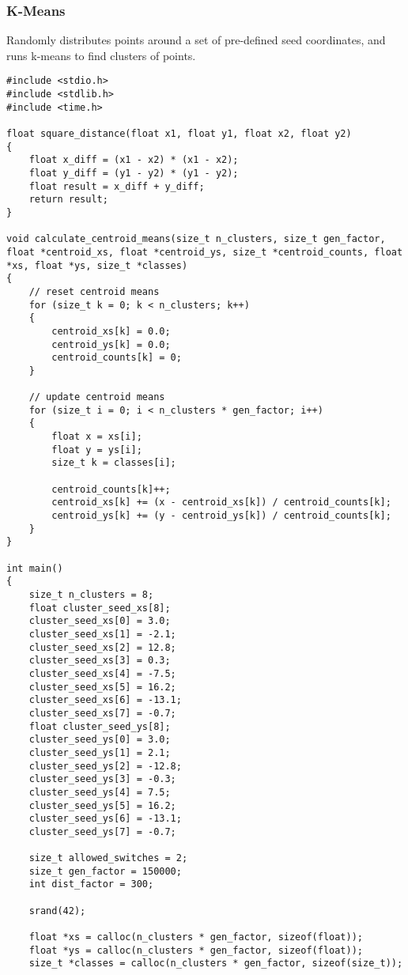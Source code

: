 \subsubsection{K-Means}

Randomly distributes points around a set of pre-defined seed coordinates, and runs k-means to find clusters of points.

\begin{lstlisting}[caption=k\_means.c]
#include <stdio.h>
#include <stdlib.h>
#include <time.h>

float square_distance(float x1, float y1, float x2, float y2)
{
    float x_diff = (x1 - x2) * (x1 - x2);
    float y_diff = (y1 - y2) * (y1 - y2);
    float result = x_diff + y_diff;
    return result;
}

void calculate_centroid_means(size_t n_clusters, size_t gen_factor, float *centroid_xs, float *centroid_ys, size_t *centroid_counts, float *xs, float *ys, size_t *classes)
{
    // reset centroid means
    for (size_t k = 0; k < n_clusters; k++)
    {
        centroid_xs[k] = 0.0;
        centroid_ys[k] = 0.0;
        centroid_counts[k] = 0;
    }

    // update centroid means
    for (size_t i = 0; i < n_clusters * gen_factor; i++)
    {
        float x = xs[i];
        float y = ys[i];
        size_t k = classes[i];

        centroid_counts[k]++;
        centroid_xs[k] += (x - centroid_xs[k]) / centroid_counts[k];
        centroid_ys[k] += (y - centroid_ys[k]) / centroid_counts[k];
    }
}

int main()
{
    size_t n_clusters = 8;
    float cluster_seed_xs[8];
    cluster_seed_xs[0] = 3.0;
    cluster_seed_xs[1] = -2.1;
    cluster_seed_xs[2] = 12.8;
    cluster_seed_xs[3] = 0.3;
    cluster_seed_xs[4] = -7.5;
    cluster_seed_xs[5] = 16.2;
    cluster_seed_xs[6] = -13.1;
    cluster_seed_xs[7] = -0.7;
    float cluster_seed_ys[8];
    cluster_seed_ys[0] = 3.0;
    cluster_seed_ys[1] = 2.1;
    cluster_seed_ys[2] = -12.8;
    cluster_seed_ys[3] = -0.3;
    cluster_seed_ys[4] = 7.5;
    cluster_seed_ys[5] = 16.2;
    cluster_seed_ys[6] = -13.1;
    cluster_seed_ys[7] = -0.7;

    size_t allowed_switches = 2;
    size_t gen_factor = 150000;
    int dist_factor = 300;

    srand(42);

    float *xs = calloc(n_clusters * gen_factor, sizeof(float));
    float *ys = calloc(n_clusters * gen_factor, sizeof(float));
    size_t *classes = calloc(n_clusters * gen_factor, sizeof(size_t));


\end{lstlisting}
